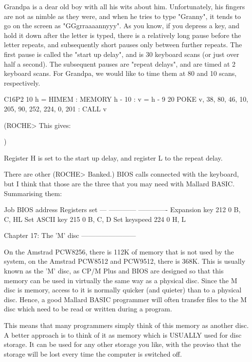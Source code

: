 Grandpa  is  a dear old boy with all his wits about  him.  Unfortunately,  his 
fingers are not as nimble as they were, and when he tries to type "Granny", it 
tends  to go on the screen as "GGgrraaaannyyy". As you know, if you depress  a 
key,  and hold it down after the letter is typed, there is a  relatively  long 
pause  before the letter repeats, and subsequently short pauses  only  between 
further  repeats.  The first pause is called the "start up delay", and  is  30 
keyboard scans (or just over half a second). The subsequent pauses are "repeat 
delays", and are timed at 2 keyboard scans. For Grandpa, we would like to time 
them at 80 and 10 scans, respectively.

        C16P2
        10 h = HIMEM : MEMORY h - 10 : v = h - 9
        20 POKE v, 38, 80, 46, 10, 205, 90, 252, 224, 0, 201 : CALL v

(ROCHE> This gives:

$$$$
)

Register H is set to the start up delay, and register L to the repeat delay.

There are other (ROCHE> Banked.) BIOS calls connected with the keyboard, but I 
think  that  those  are  the  three that you  may  need  with  Mallard  BASIC. 
Summarising them:

        Job                BIOS address        Registers set
        ---                ------------        -------------
        Expansion key      212 0               B, C, HL
        Set ASCII key      215 0               B, C, D
        Set keyspeed       224 0               H, L


Chapter 17: The 'M' disc
------------------------

On  the  Amstrad  PCW8256, there is 112K of memory that is  not  used  by  the 
system,  on  the Amstrad PCW8512 and PCW9512, there is 368K. This  is  usually 
known as the 'M' disc, as CP/M Plus and BIOS are designed so that this  memory 
can be used in virtually the same way as a physical disc. Since the M disc  is 
memory,  access  to it is normally quicker (and quieter) than  to  a  physical 
disc. Hence, a good Mallard BASIC programmer will often transfer files to  the 
M disc which need to be read or written during a program.

This means that many programmers simply think of this memory as another  disc. 
A  better approach is to think of it as memory which is USUALLY used for  disc 
storage. It can be used for any other storage you like, with the proviso  that 
the storage will be lost every time the computer is switched off.

